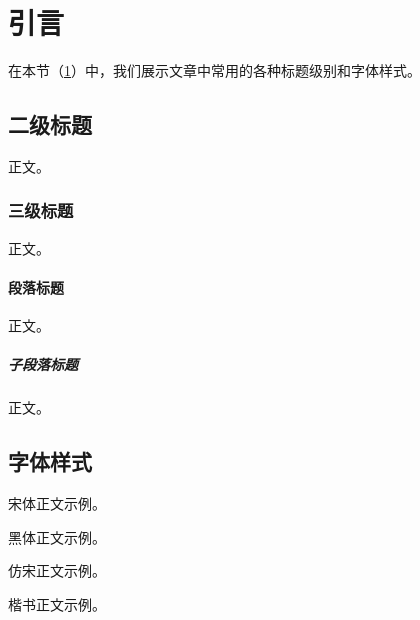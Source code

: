 \section{引言}\label{sec:introduction}

在本节（\cref{sec:introduction}）中，我们展示文章中常用的各种标题级别和字体样式。

\subsection{二级标题}

正文。

\subsubsection{三级标题}

正文。

\paragraph{段落标题}

正文。

\subparagraph{子段落标题}

正文。

\subsection{字体样式}

{\songti 宋体正文示例。}

{\heiti 黑体正文示例。}

{\fangsong 仿宋正文示例。}

{\kaishu 楷书正文示例。}